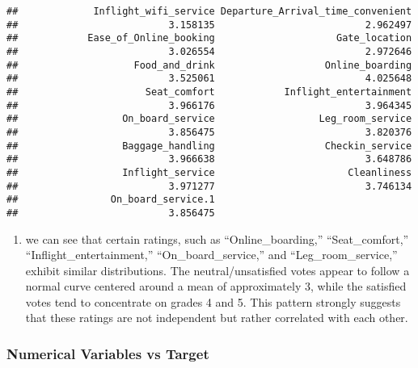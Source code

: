 \documentclass[
]{article}
\providecommand{\tightlist}{%
  \setlength{\itemsep}{0pt}\setlength{\parskip}{0pt}}
\begin{document}
\begin{verbatim}
##             Inflight_wifi_service Departure_Arrival_time_convenient 
##                          3.158135                          2.962497 
##            Ease_of_Online_booking                     Gate_location 
##                          3.026554                          2.972646 
##                    Food_and_drink                   Online_boarding 
##                          3.525061                          4.025648 
##                      Seat_comfort            Inflight_entertainment 
##                          3.966176                          3.964345 
##                  On_board_service                  Leg_room_service 
##                          3.856475                          3.820376 
##                  Baggage_handling                   Checkin_service 
##                          3.966638                          3.648786 
##                  Inflight_service                       Cleanliness 
##                          3.971277                          3.746134 
##                On_board_service.1 
##                          3.856475
\end{verbatim}

\begin{enumerate}
\def\labelenumi{\arabic{enumi}.}
\setcounter{enumi}{2}
\tightlist
\item
  we can see that certain ratings, such as ``Online\_boarding,''
  ``Seat\_comfort,'' ``Inflight\_entertainment,''
  ``On\_board\_service,'' and ``Leg\_room\_service,'' exhibit similar
  distributions. The neutral/unsatisfied votes appear to follow a normal
  curve centered around a mean of approximately 3, while the satisfied
  votes tend to concentrate on grades 4 and 5. This pattern strongly
  suggests that these ratings are not independent but rather correlated
  with each other.
\end{enumerate}

\hypertarget{numerical-variables-vs-target}{%
\subsubsection{Numerical Variables vs
Target}\label{numerical-variables-vs-target}}
\end{document}
